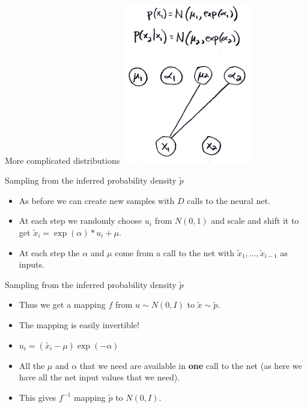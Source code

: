 \documentclass[usenames,dvipsnames]{beamer}
\begin{document}
\begin{frame}{More complicated distributions}
     \centering
     \includegraphics[height=7cm]{image_05}
\end{frame}


\begin{frame}{Sampling from the inferred probability density $\tilde{p}$}
    \begin{itemize}
      \item{As before we can create new samples with $D$ calls to the neural net.}
	\item{At each step we randomly choose $u_i$ from $N(0, 1)$ and scale and shift it to get $\tilde{x}_i = \exp(\alpha) * u_i + \mu$.}
	\item{At each step the $\alpha$ and $\mu$ come from a call to the net with $\tilde{x}_1, \dots, \tilde{x}_{i-1}$ as inputs.}
    \end{itemize}
\end{frame}

\begin{frame}{Sampling from the inferred probability density $\tilde{p}$}
    \begin{itemize}
      \item{Thus we get a mapping $f$ from $u \sim N(0, I)$ to $\tilde{x} \sim \tilde{p}$.}
	\item{The mapping is easily invertible!}
	\item{$u_i = (\tilde{x_i} - \mu) \exp(-\alpha)$}
	\item{All the $\mu$ and $\alpha$ that we need are available in \textbf{one} call to the net (as here we have all the net input values that we need).}
	\item{This gives $f^{-1}$ mapping $\tilde{p}$ to $N(0, I)$.}
    \end{itemize}
\end{frame}
\end{document}
